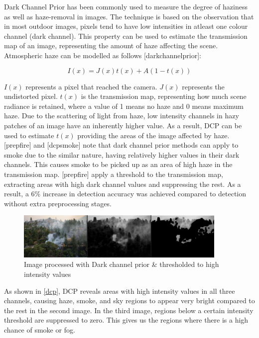 Dark Channel Prior has been commonly used to measure the degree of
haziness as well as haze-removal in images. The technique is based on
the observation that in most outdoor images, pixels tend to have low
intensities in atleast one colour channel (dark channel). This property
can be used to estimate the transmission map of an image, representing
the amount of haze affecting the scene. Atmospheric haze can be modelled
as follows {[}darkchannelprior{]}:

\[I(x) = J(x)t(x) + A\left( 1 - t(x) \right)\]

\(I(x)\) represents a pixel that reached the camera. \(J(x)\) represents
the undistorted pixel. \(t(x)\) is the transmission map, representing
how much scene radiance is retained, where a value of 1 means no haze
and 0 means maximum haze. Due to the scattering of light from haze, low
intensity channels in hazy patches of an image have an inherently higher
value. As a result, DCP can be used to estimate \(t(x)\) providing the
areas of the image affected by haze. {[}prepfire{]} and {[}dcpsmoke{]}
note that dark channel prior methods can apply to smoke due to the
similar nature, having relatively higher values in their dark channels.
This causes smoke to be picked up as an area of high haze in the
transmission map. {[}prepfire{]} apply a threshold to the transmission
map, extracting areas with high dark channel values and suppressing the
rest. As a result, a 6\% increase in detection accuracy was achieved
compared to detection without extra preprocessing stages.

\begin{figure}
\centering
\includegraphics[width=0.9\textwidth,height=\textheight]{dcp.png}
\caption{Image processed with Dark channel prior \& thresholded to high
intensity values}
\end{figure}

\label{dcp}{}

As shown in \hyperref[dcp]{{[}dcp{]}}, DCP reveals areas with high
intensity values in all three channels, causing haze, smoke, and sky
regions to appear very bright compared to the rest in the second image.
In the third image, regions below a certain intensity threshold are
suppressed to zero. This gives us the regions where there is a high
chance of smoke or fog.

